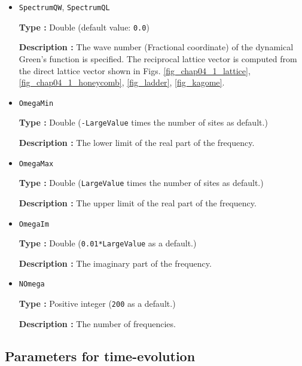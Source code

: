 \begin{itemize}
\item \verb|SpectrumQW|, \verb|SpectrumQL|
  
  {\bf Type :} Double (default value: \verb|0.0|)

  {\bf Description :} The wave number (Fractional coordinate) of the
  dynamical Green's function is specified.
  The reciprocal lattice vector is computed from the
  direct lattice vector shown in Figs.
  \ref{fig_chap04_1_lattice}, \ref{fig_chap04_1_honeycomb},
  \ref{fig_ladder}, \ref{fig_kagome}.

\item \verb|OmegaMin|

  {\bf Type :} Double (\verb|-LargeValue| times the number of sites as default.)
  
  {\bf Description :} The lower limit of the real part of the frequency.
    
\item \verb|OmegaMax|

  {\bf Type :} Double (\verb|LargeValue| times the number of sites as default.)
    
  {\bf Description :} The upper limit of the real part of the frequency.

\item \verb|OmegaIm|

  {\bf Type :} Double (\verb|0.01*LargeValue| as a default.)
    
  {\bf Description :} The imaginary part of the frequency.

\item \verb|NOmega|
  
  {\bf Type :} Positive integer (\verb|200| as a default.)
    
  {\bf Description :} The number of frequencies.

\end{itemize}

\subsection{Parameters for time-evolution}

